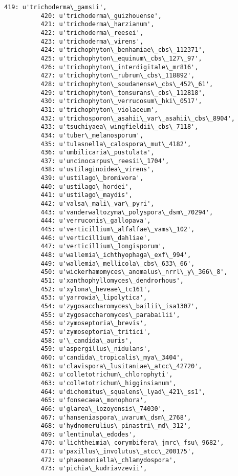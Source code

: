 \documentclass[11pt]{article}
\begin{document}
\begin{Verbatim}[commandchars=\\\{\}]
          419: u'trichoderma\_gamsii',
          420: u'trichoderma\_guizhouense',
          421: u'trichoderma\_harzianum',
          422: u'trichoderma\_reesei',
          423: u'trichoderma\_virens',
          424: u'trichophyton\_benhamiae\_cbs\_112371',
          425: u'trichophyton\_equinum\_cbs\_127\_97',
          426: u'trichophyton\_interdigitale\_mr816',
          427: u'trichophyton\_rubrum\_cbs\_118892',
          428: u'trichophyton\_soudanense\_cbs\_452\_61',
          429: u'trichophyton\_tonsurans\_cbs\_112818',
          430: u'trichophyton\_verrucosum\_hki\_0517',
          431: u'trichophyton\_violaceum',
          432: u'trichosporon\_asahii\_var\_asahii\_cbs\_8904',
          433: u'tsuchiyaea\_wingfieldii\_cbs\_7118',
          434: u'tuber\_melanosporum',
          435: u'tulasnella\_calospora\_mut\_4182',
          436: u'umbilicaria\_pustulata',
          437: u'uncinocarpus\_reesii\_1704',
          438: u'ustilaginoidea\_virens',
          439: u'ustilago\_bromivora',
          440: u'ustilago\_hordei',
          441: u'ustilago\_maydis',
          442: u'valsa\_mali\_var\_pyri',
          443: u'vanderwaltozyma\_polyspora\_dsm\_70294',
          444: u'verruconis\_gallopava',
          445: u'verticillium\_alfalfae\_vams\_102',
          446: u'verticillium\_dahliae',
          447: u'verticillium\_longisporum',
          448: u'wallemia\_ichthyophaga\_exf\_994',
          449: u'wallemia\_mellicola\_cbs\_633\_66',
          450: u'wickerhamomyces\_anomalus\_nrrl\_y\_366\_8',
          451: u'xanthophyllomyces\_dendrorhous',
          452: u'xylona\_heveae\_tc161',
          453: u'yarrowia\_lipolytica',
          454: u'zygosaccharomyces\_bailii\_isa1307',
          455: u'zygosaccharomyces\_parabailii',
          456: u'zymoseptoria\_brevis',
          457: u'zymoseptoria\_tritici',
          458: u'\_candida\_auris',
          459: u'aspergillus\_nidulans',
          460: u'candida\_tropicalis\_mya\_3404',
          461: u'clavispora\_lusitaniae\_atcc\_42720',
          462: u'colletotrichum\_chlorophyti',
          463: u'colletotrichum\_higginsianum',
          464: u'dichomitus\_squalens\_lyad\_421\_ss1',
          465: u'fonsecaea\_monophora',
          466: u'glarea\_lozoyensis\_74030',
          467: u'hanseniaspora\_uvarum\_dsm\_2768',
          468: u'hydnomerulius\_pinastri\_md\_312',
          469: u'lentinula\_edodes',
          470: u'lichtheimia\_corymbifera\_jmrc\_fsu\_9682',
          471: u'paxillus\_involutus\_atcc\_200175',
          472: u'phaeomoniella\_chlamydospora',
          473: u'pichia\_kudriavzevii',

\end{Verbatim}
\end{document}
